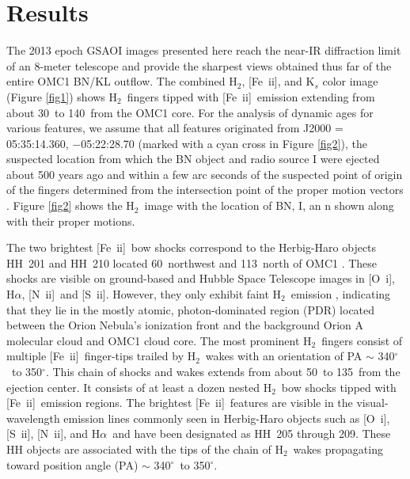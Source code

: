 \documentclass{aa}
\newcommand\arcdeg{\mbox{$^\circ$}\xspace}  %
\newcommand{\Ha}{\mbox{H$\alpha$}}
\newcommand{\sii}{[S~{\sc ii]}}
\newcommand{\Feii}{[Fe~{\sc ii}]}
\newcommand{\oi}{[O~{\sc i}]}
\newcommand{\nii}{[N~{\sc ii}]}
\newcommand{\hh}{\ensuremath{\textrm{H}_{2}}}			%
\begin{document}
\section{Results}

The 2013 epoch GSAOI images presented here reach the near-IR diffraction limit of an 
8-meter telescope and provide the sharpest views obtained thus far of the 
entire  OMC1 BN/KL  outflow.      The combined \hh , \Feii , and K$_s$ color 
image (Figure \ref{fig1}) shows  \hh\ fingers 
tipped with \Feii\  emission extending from about 30\arcsec\ to 140\arcsec\ from the OMC1 core.  
For the analysis of dynamic ages for various features, we assume that all features originated
from J2000 = 05:35:14.360, $-$05:22:28.70 (marked with a cyan cross in Figure \ref{fig2}),
the suspected location from which the BN object 
and radio source I  were ejected about 500 years ago  \citep{Gomez2008} and within a 
few arc seconds of the suspected point of origin of the fingers determined from the
intersection point of the proper motion vectors \citep{Bally2011}.   
Figure \ref{fig2} shows the \hh\ image with the location of BN, I, an n shown along with
their proper motions.

The two brightest \Feii\  bow shocks  correspond to the Herbig-Haro objects 
HH~201  and HH~210 located 60\arcsec\ northwest and  113\arcsec\  north of  OMC1
\citep{Gull1973,MunchTaylor1974,Canto1980,AxonTaylor1984}.   
These shocks are visible on ground-based and Hubble Space Telescope images in
\oi  ,  H$\alpha$,  \nii\, and \sii .  However, they  only exhibit  faint  \hh\ emission
\citep{Graham2003}, indicating that
they lie in the mostly atomic,  photon-dominated region (PDR) located between the Orion
Nebula's ionization front and the background Orion A molecular cloud and OMC1 cloud core.    
The most prominent  \hh\ fingers consist of  multiple \Feii\  finger-tips trailed by \hh\ wakes
with an  orientation of PA $\sim$ 340\arcdeg\ to 350\arcdeg  .   This chain of shocks and
wakes extends  from about 50\arcsec\  to 135\arcsec\ from the ejection center.  It
consists of  at least a dozen  nested \hh\ bow shocks tipped  with \Feii\ emission regions.      
The brightest  \Feii\  features are visible in the visual-wavelength  emission lines 
commonly seen in Herbig-Haro objects such as \oi , \sii , \nii , and \Ha\  and have
been designated as  HH~205 through 209.  These HH objects 
are associated with the tips of the chain of \hh\  wakes propagating toward position angle
(PA) $\sim$  340\arcdeg\ to 350\arcdeg .   
\end{document}
